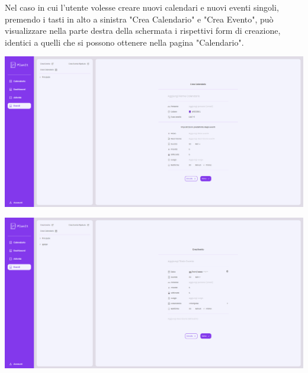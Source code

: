 Nel caso in cui l'utente volesse creare nuovi calendari e nuovi eventi singoli, premendo i tasti in alto a sinistra "Crea Calendario" e "Crea Evento", può visualizzare nella parte destra della schermata i rispettivi form di creazione, identici a quelli che si possono ottenere nella pagina "Calendario".

\begin{center}
    \includegraphics[width=1\textwidth, height=0.3\textheight]{img/png/FrontEnd/Eventi/EventiCreaCalendario.png}
\end{center}

\begin{center}
    \includegraphics[width=1\textwidth, height=0.3\textheight]{img/png/FrontEnd/Eventi/EventiCreaEvento.png}
\end{center}

